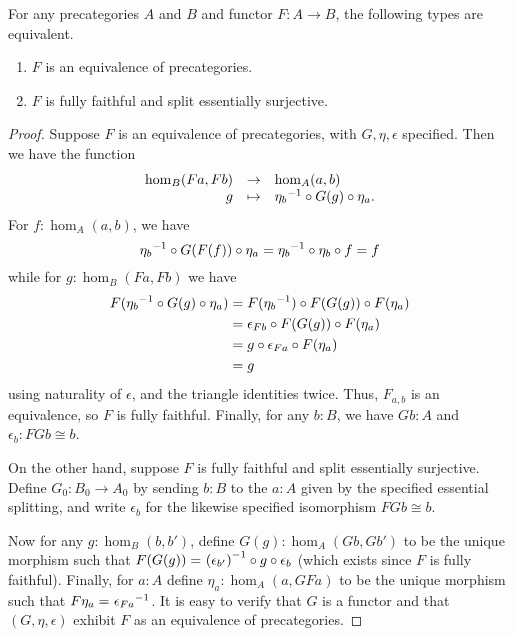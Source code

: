 \begin{lem}\label{ct:ffeso}
  For any precategories $A$ and $B$ and functor $F:A\to B$, the following types are equivalent.
  \begin{enumerate}
  \item $F$ is an equivalence of precategories.\label{item:ct:ffeso1}
  \item $F$ is fully faithful and split essentially surjective.\label{item:ct:ffeso2}
  \end{enumerate}
\end{lem}
\begin{proof}
  Suppose $F$ is an equivalence of precategories, with $G,\eta,\epsilon$ specified.
  Then we have the function
  \begin{equation*}
    \begin{array}{rcl}
      \hom_B(Fa,Fb) &\to& \hom_A(a,b)\\
      g &\mapsto& {\eta_b}^{-1}\circ G(g)\circ \eta_a.
    \end{array}
  \end{equation*}
  For $f:\hom_A(a,b)$, we have
  \[ {\eta_{b}}^{-1}\circ G(F(f))\circ \eta_{a}  =
  {\eta_{b}}^{-1} \circ \eta_{b} \circ f=
  f
  \]
  while for $g:\hom_B(Fa,Fb)$ we have
  \begin{align*}
    F({\eta_b}^{-1} \circ G(g)\circ\eta_a)
    &= F({\eta_b}^{-1})\circ F(G(g))\circ F(\eta_a)\\
    &= \epsilon_{Fb}\circ F(G(g))\circ F(\eta_a)\\
    &= g\circ\epsilon_{Fa}\circ F(\eta_a)\\
    &= g
  \end{align*}
  using naturality of $\epsilon$, and the triangle identities twice.
  Thus, $F_{a,b}$ is an equivalence, so $F$ is fully faithful.
  Finally, for any $b:B$, we have $Gb:A$ and $\epsilon_b:FGb\cong b$.

  On the other hand, suppose $F$ is fully faithful and split essentially surjective.
  Define $G_0:B_0\to A_0$ by sending $b:B$ to the $a:A$ given by the specified essential splitting, and write $\epsilon_b$ for the likewise specified isomorphism $FGb\cong b$.

  Now for any $g:\hom_B(b,b')$, define $G(g):\hom_A(Gb,Gb')$ to be the unique morphism such that $F(G(g)) =_{} {(\epsilon_{b'})}^{-1}\circ g \circ \epsilon_b $ (which exists since $F$ is fully faithful).
  Finally, for $a:A$ define $\eta_a:\hom_A(a,GFa)$ to be the unique morphism such that $F\eta_a =_{} {\epsilon_{Fa}}^{-1}$.
  It is easy to verify that $G$ is a functor and that $(G,\eta,\epsilon)$ exhibit $F$ as an equivalence of precategories.


\end{proof}
